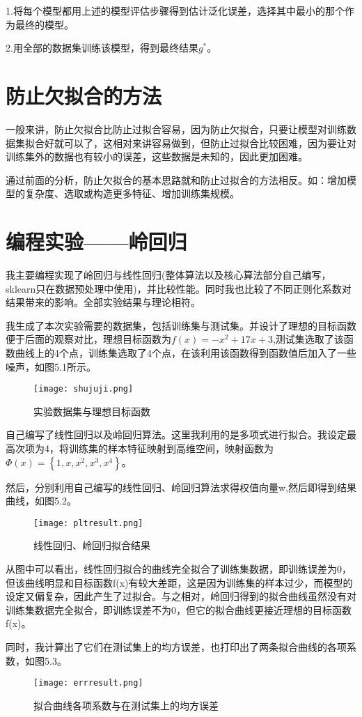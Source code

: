 \documentclass[forprint]{report}
\begin{document}
\noindent
1.将每个模型都用上述的模型评估步骤得到估计泛化误差，选择其中最小的那个作为最终的模型。

\noindent
2.用全部的数据集训练该模型，得到最终结果$g^*$。
\chapter{防止欠拟合的方法}
一般来讲，防止欠拟合比防止过拟合容易，因为防止欠拟合，只要让模型对训练数据集拟合好就可以了，这相对来讲容易做到，但防止过拟合比较困难，因为要让对训练集外的数据也有较小的误差，这些数据是未知的，因此更加困难。

通过前面的分析，防止欠拟合的基本思路就和防止过拟合的方法相反。如：增加模型的复杂度、选取或构造更多特征、增加训练集规模。
\chapter{编程实验——岭回归}
我主要编程实现了岭回归与线性回归(整体算法以及核心算法部分自己编写，sklearn只在数据预处理中使用)，并比较性能。同时我也比较了不同正则化系数对结果带来的影响。全部实验结果与理论相符。

我生成了本次实验需要的数据集，包括训练集与测试集。并设计了理想的目标函数便于后面的观察对比，理想目标函数为$f\left( x \right) =-x^2+17x+3$,测试集选取了该函数曲线上的4个点，训练集选取了4个点，在该利用该函数得到函数值后加入了一些噪声，如图5.1所示。
\begin{figure}[ht]
	\centering
	\texttt{[image: shujuji.png]}
	\caption{实验数据集与理想目标函数}
	\label{fig:1}
\end{figure}

自己编写了线性回归以及岭回归算法。这里我利用的是多项式进行拟合。我设定最高次项为4，将训练集的样本特征映射到高维空间，映射函数为$\varPhi \left( x \right) =\left\{ 1,x,x^2,x^3,x^4 \right\}$。

然后，分别利用自己编写的线性回归、岭回归算法求得权值向量w,然后即得到结果曲线，如图5.2。
\begin{figure}[ht]
	\centering
	\texttt{[image: pltresult.png]}
	\caption{线性回归、岭回归拟合结果}
	\label{fig:1}
\end{figure}

从图中可以看出，线性回归拟合的曲线完全拟合了训练集数据，即训练误差为0，但该曲线明显和目标函数f(x)有较大差距，这是因为训练集的样本过少，而模型的设定又偏复杂，因此产生了过拟合。与之相对，岭回归得到的拟合曲线虽然没有对训练集数据完全拟合，即训练误差不为0，但它的拟合曲线更接近理想的目标函数f(x)。

同时，我计算出了它们在测试集上的均方误差，也打印出了两条拟合曲线的各项系数，如图5.3。
\begin{figure}[ht]
	\centering
	\texttt{[image: errresult.png]}
	\caption{拟合曲线各项系数与在测试集上的均方误差}
	\label{fig:1}
\end{figure}
\end{document}
